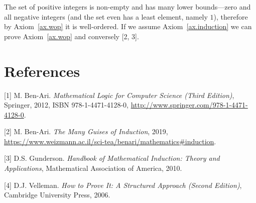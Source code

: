 \documentclass[12pt,a4paper]{article}
\begin{document}
The set of positive integers is non-empty and has many lower bounds---zero and all negative integers (and the set even has a least element, namely $1$), therefore by Axiom~\ref{ax.wop} it is well-ordered. If we assume Axiom~\ref{ax.induction} we can prove Axiom~\ref{ax.wop} and conversely [2, 3].


\section{References}

[1] M. Ben-Ari. \textit{Mathematical Logic for Computer Science (Third Edition)}, Springer, 2012, ISBN 978-1-4471-4128-0, \url{http://www.springer.com/978-1-4471-4128-0}.

[2] M. Ben-Ari. \textit{The Many Guises of Induction}, 2019, \url{https://www.weizmann.ac.il/sci-tea/benari/mathematics#induction}.

[3] D.S. Gunderson. \textit{Handbook of Mathematical Induction: Theory and Applications}, Mathematical Association of America, 2010.

[4] D.J. Velleman. \textit{How to Prove It: A Structured Approach (Second Edition)}, Cambridge University Press, 2006.

\balance
\printindex
\end{document}
